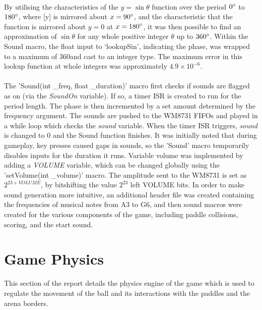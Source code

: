 \documentclass[a4paper,12pt]{article}
\begin{document}
\begin{flushleft}
\- \\
By utilising the characteristics of the $y=\sin\theta$ function over the period $0\degree$ to $180\degree$, where [y] is mirrored about $x=90\degree$, and the characteristic that the function is mirrored about $y=0$ at $x=180\degree$, it was then possible to find an approximation of $\sin\theta$ for any whole positive integer $\theta$ up to $360\degree$. Within the Sound macro, the float input to ‘lookupSin’, indicating the phase, was wrapped to a maximum of 360\degree and cast to an integer type. The maximum error in this lookup function at whole integers was approximately $4.9\times10^{-6}$.
\\ \- \\
The 'Sound(int \_freq, float \_duration)' macro first checks if sounds are flagged as on (via the \textit{SoundOn} variable). If so, a timer ISR is created to run for the period length. The phase is then incremented by a set amount determined by the frequency argument. The sounds are pushed to the WM8731 FIFOs and played in a while loop which checks the \textit{sound} variable. When the timer ISR triggers, \textit{sound} is changed to 0 and the Sound function finishes. It was initially noted that during gameplay, key presses caused gaps in sounds, so the 'Sound' macro temporarily disables inputs for the duration it runs.
Variable volume was implemented by adding a \textit{VOLUME} variable, which can be changed globally using the 'setVolume(int \_volume)' macro. The amplitude sent to the WM8731 is set as $2^{23+VOLUME}$, by bitshifting the value $2^{23}$ left VOLUME bits.
In order to make sound generation more intuitive, an additional header file was created containing the frequencies of musical notes from A3 to G6, and then sound macros were created for the various components of the game, including paddle collisions, scoring, and the start sound.
\end{flushleft}

\newpage
\section{Game Physics}
\begin{flushleft}
This section of the report details the physics engine of the game which is used to regulate the movement of the ball and its interactions with the paddles and the arena borders. 
\end{flushleft}
\end{document}
